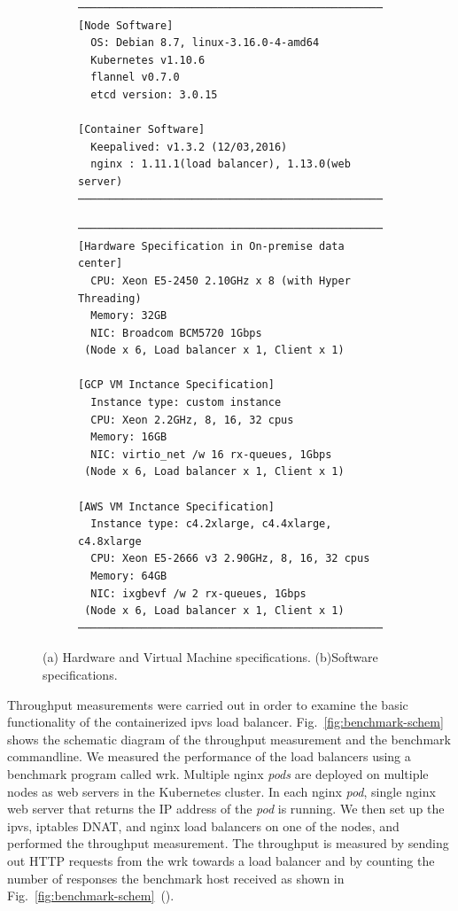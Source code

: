 \begin{figure}[tb]

  \begin{subfigure}[t]{\columnwidth}
\begin{Verbatim}[commandchars=\\\{\}]
───────────────────────────────────────────────────────
[Node Software]
  OS: Debian 8.7, linux-3.16.0-4-amd64
  Kubernetes v1.10.6
  flannel v0.7.0
  etcd version: 3.0.15

[Container Software]
  Keepalived: v1.3.2 (12/03,2016)
  nginx : 1.11.1(load balancer), 1.13.0(web server) 
───────────────────────────────────────────────────────
\end{Verbatim}
    \caption{}
    \label{fig:machine_spec}
  \end{subfigure}

  \begin{subfigure}[t]{\columnwidth}
\begin{Verbatim}[commandchars=\\\{\}]
───────────────────────────────────────────────────────
[Hardware Specification in On-premise data center]
  CPU: Xeon E5-2450 2.10GHz x 8 (with Hyper Threading) 
  Memory: 32GB
  NIC: Broadcom BCM5720 1Gbps
 (Node x 6, Load balancer x 1, Client x 1)

[GCP VM Inctance Specification]
  Instance type: custom instance
  CPU: Xeon 2.2GHz, 8, 16, 32 cpus
  Memory: 16GB
  NIC: virtio_net /w 16 rx-queues, 1Gbps
 (Node x 6, Load balancer x 1, Client x 1)

[AWS VM Inctance Specification]
  Instance type: c4.2xlarge, c4.4xlarge, c4.8xlarge 
  CPU: Xeon E5-2666 v3 2.90GHz, 8, 16, 32 cpus
  Memory: 64GB
  NIC: ixgbevf /w 2 rx-queues, 1Gbps
 (Node x 6, Load balancer x 1, Client x 1)
───────────────────────────────────────────────────────
\end{Verbatim}
    \caption{}
    \label{fig:software_spec}
  \end{subfigure}

  \caption{
    (a) Hardware and Virtual Machine specifications. (b)Software specifications.
  }
  \label{fig:benchmark-spec}
\end{figure}

Throughput measurements were carried out in order to examine the basic functionality of the containerized ipvs load balancer.
Fig.~\ref{fig:benchmark-schem} shows the schematic diagram of the throughput measurement and the benchmark commandline.
We measured the performance of the load balancers using a benchmark program called wrk\cite{Glozer2016}.
Multiple nginx {\em pods} are deployed on multiple nodes as web servers in the Kubernetes cluster.
In each nginx {\em pod}, single nginx web server that returns the IP address of the {\em pod} is running.
We then set up the ipvs, iptables DNAT, and nginx load balancers on one of the nodes, and performed the throughput measurement.
The throughput is measured by sending out HTTP requests from the wrk towards a load balancer and by counting the number of responses the benchmark host received as shown in Fig.~\ref{fig:benchmark-schem}~().

